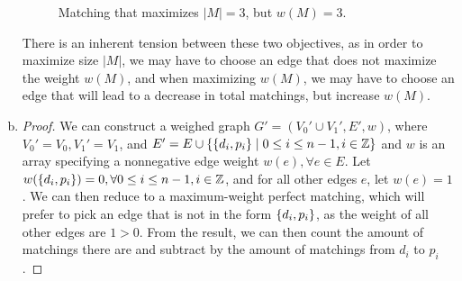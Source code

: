 \documentclass[11pt]{scrartcl}
\theoremstyle{dotlessP}
\theoremstyle{dotlessN}
\DeclarePairedDelimiter\set{\{}{\}}
\newcommand{\unite}{\cup}
\newcommand{\ints}{\mathbb{Z}}
\begin{document}
\begin{enumerate}[(a)]
\begin{figure}[H]
\caption{Matching that maximizes $|M| = 3$, but $w(M) = 3$.}
\end{figure}
There is an inherent tension between these two objectives, as in order to maximize size $|M|$, we may have to choose an edge that does not maximize the weight $w(M)$, and when maximizing $w(M)$, we may have to choose an edge that will lead to a decrease in total matchings, but increase $w(M)$.
\item 
	\begin{proof}
		We can construct a weighed graph $G' = (V_0' \unite V_1', E', w)$, where $V_0' = V_0, V_1' = V_1$, and $E' = E \unite \set*{\set*{d_i, p_i} \mid 0 \leq i \leq n-1, i \in \ints}$ and $w$ is an array specifying a nonnegative edge weight $w(e), \forall e \in E$. Let $w(\set*{d_i, p_i}) = 0, \forall 0 \leq i \leq n-1, i \in \ints$, and for all other edges $e$, let $w(e) = 1$. We can then reduce to a maximum-weight perfect matching, which will prefer to pick an edge that is not in the form $\set*{d_i, p_i}$, as the weight of all other edges are $1 > 0$. From the result, we can then count the amount of matchings there are and subtract by the amount of matchings from $d_i$ to $p_i$.
	\end{proof}
\end{enumerate}
\end{document}
